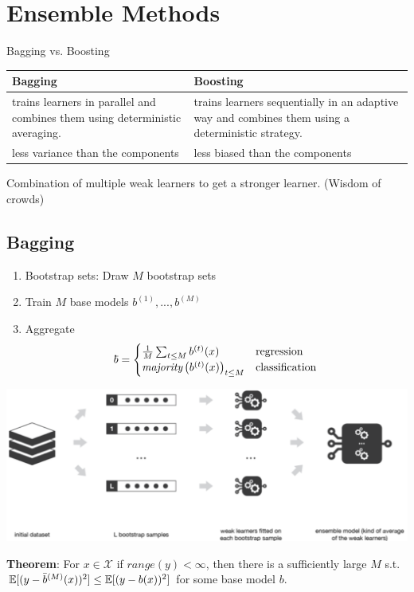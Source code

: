 \section{Ensemble Methods}
\begin{highlight}{Bagging vs. Boosting}
\begin{tabular}{ p{} | p{} }
		\textbf{Bagging} & \textbf{Boosting}\\\hline
		 trains learners in parallel and combines them using deterministic averaging. & trains learners sequentially in an adaptive way and combines them using a deterministic strategy. \\\hline
  		 less variance than the components & less biased than the components 
\end{tabular}



\end{highlight}
Combination of multiple weak learners to get a stronger learner. (Wisdom of crowds)
\subsection{Bagging}
\begin{enumerate}
	\item Bootstrap sets: Draw $M$ bootstrap sets
	\item Train $M$ base models $b^{(1)}, ... , b^{(M)}$
	\item Aggregate 
	$$	\bbar =
		\begin{cases}
			\frac{1}{M}\sum_{t\leq M} b^{(t)}(x) &\text{regression}\\
			\textit{majority}\left(b^{(t)}(x)\right)_{t\leq M}&\text{classification}
		\end{cases}
	$$
\end{enumerate}
\begin{center}
	\includegraphics[width=\columnwidth]{images/9-bagging}
\end{center}

\textbf{Theorem}: For $x\in \mathcal X$ if $range(y) < \infty$, then there is a sufficiently large $M$ s.t. $\mathbb E[(y - \bar{b}^{(M)}(x))^2] \leq \mathbb E[(y - b(x))^2]$ for some base model $b$.

